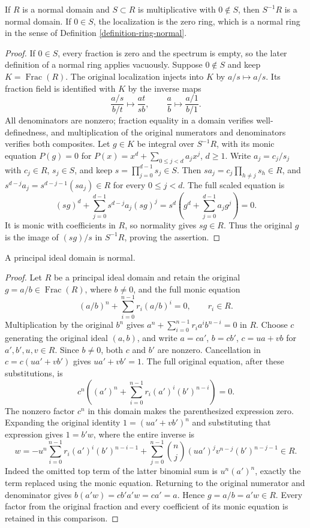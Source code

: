 \begin{lemma}
\label{lemma-localize-normal-domain}
If $R$ is a normal domain and $S\subset R$ is multiplicative
with $0\notin S$, then $S^{-1}R$ is a normal domain.
If $0\in S$, the localization is the zero ring, which is a normal
ring in the sense of Definition \ref{definition-ring-normal}.
\end{lemma}

\begin{proof}
If $0\in S$, every fraction is zero and the spectrum is empty,
so the later definition of a normal ring applies vacuously.
Suppose $0\notin S$ and keep $K=\operatorname{Frac}(R)$.
The original localization injects into $K$ by $a/s\mapsto a/s$.
Its fraction field is identified with $K$ by the inverse maps
$$
\frac{a/s}{b/t}\longmapsto\frac{at}{sb},\qquad
\frac ab\longmapsto\frac{a/1}{b/1}.
$$
All denominators are nonzero; fraction equality in a domain
verifies well-definedness, and multiplication of the original
numerators and denominators verifies both composites.
Let $g\in K$ be integral over $S^{-1}R$, with its monic equation
$P(g)=0$ for $P(x)=x^d+\sum_{0\leq j<d}a_jx^j$, $d\geq1$.
Write $a_j=c_j/s_j$ with $c_j\in R$, $s_j\in S$, and keep
$s=\prod_{j=0}^{d-1}s_j\in S$.
Then $sa_j=c_j\prod_{h\ne j}s_h\in R$, and
$s^{d-j}a_j=s^{d-j-1}(sa_j)\in R$ for every $0\leq j<d$.
The full scaled equation is
$$
(sg)^d+\sum_{j=0}^{d-1}s^{d-j}a_j(sg)^j
=s^d\left(g^d+\sum_{j=0}^{d-1}a_jg^j\right)=0.
$$
It is monic with coefficients in $R$, so normality gives
$sg\in R$. Thus the original $g$ is the image of $(sg)/s$
in $S^{-1}R$, proving the assertion.
\end{proof}

\begin{lemma}
\label{lemma-PID-normal}
A principal ideal domain is normal.
\end{lemma}

\begin{proof}
Let $R$ be a principal ideal domain and retain the original
$g=a/b\in\operatorname{Frac}(R)$, where $b\ne0$, and the full
monic equation
$$
(a/b)^n+\sum_{i=0}^{n-1}r_i(a/b)^i=0,\qquad r_i\in R.
$$
Multiplication by the original $b^n$ gives
$a^n+\sum_{i=0}^{n-1}r_i a^i b^{n-i}=0$ in $R$.
Choose $c$ generating the original ideal $(a,b)$, and write
$a=ca'$, $b=cb'$, $c=ua+vb$ for $a',b',u,v\in R$.
Since $b\ne0$, both $c$ and $b'$ are nonzero. Cancellation in
$c=c(ua'+vb')$ gives $ua'+vb'=1$.
The full original equation, after these substitutions, is
$$
c^n\left((a')^n+\sum_{i=0}^{n-1}r_i(a')^i(b')^{n-i}\right)=0.
$$
The nonzero factor $c^n$ in this domain makes the parenthesized
expression zero. Expanding the original identity
$1=(ua'+vb')^n$ and substituting that expression gives $1=b'w$,
where the entire inverse is
$$
w=-u^n\sum_{i=0}^{n-1}r_i(a')^i(b')^{n-i-1}
+\sum_{j=0}^{n-1}\binom nj(ua')^jv^{n-j}(b')^{n-j-1}\in R.
$$
Indeed the omitted top term of the latter binomial sum is
$u^n(a')^n$, exactly the term replaced using the monic equation.
Returning to the original numerator and denominator gives
$b(a'w)=cb'a'w=ca'=a$. Hence $g=a/b=a'w\in R$.
Every factor from the original fraction and every coefficient
of its monic equation is retained in this comparison.
\end{proof}

